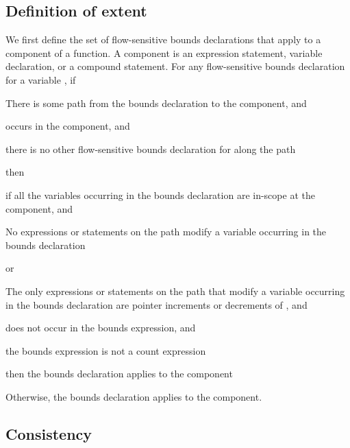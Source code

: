 \subsection{Definition of extent}
\label{section:extent-definition}

We first define the set of flow-sensitive bounds declarations that apply to a
component of a function.  A component is an expression statement,
variable declaration, or a compound statement. For any flow-sensitive bounds
declaration for a variable , if

\begin{compactenum}
\item
  There is some path from the bounds declaration to the
  component, and
\item
   occurs in the component, and
\item
  there is no other flow-sensitive bounds declaration for
   along the path
\end{compactenum}

then

\begin{compactenum}
\item
  if all the variables occurring in the bounds declaration are
  in-scope at the component, and
  \begin{compactenum}
  \item No expressions or statements on the path modify a variable
  occurring in the bounds declaration
  \item or
  \begin{compactenum}
  \item The only expressions or statements on the path that
   modify a variable occurring in the bounds declaration
   are pointer increments or decrements of , and
   \item {} does not occur in the bounds expression, and
   \item the bounds expression is not a count expression
   \end{compactenum}
   \end{compactenum}
   then the bounds declaration applies to the component
\item
   Otherwise, the bounds declaration 
   applies to the component.
\end{compactenum}

 \subsection{Consistency}

